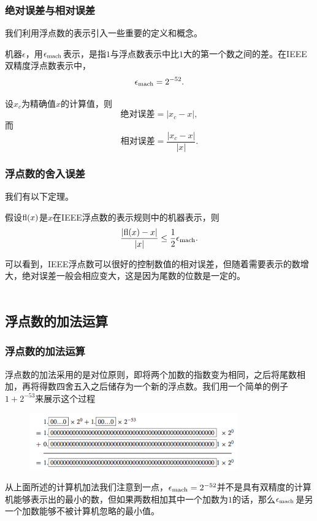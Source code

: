 \documentclass[10pt]{beamer}
\def\mach{\rm{mach}}
\begin{document}
\begin{frame}
\frametitle{绝对误差与相对误差}
我们利用浮点数的表示引入一些重要的定义和概念。
\begin{definition}[机器最小数]
机器$\epsilon$，用$\epsilon_{\mach}$表示，是指$1$与浮点数表示中比$1$大的第一个数之间的差。在IEEE双精度浮点数表示中，
\begin{equation}
\epsilon_{\mach} = 2^{-52}.
\end{equation}
\end{definition}

\begin{definition}[相对误差与绝对误差]
设$x_c$为精确值$x$的计算值，则
\begin{equation}
\text{绝对误差} = |x_c - x|,
\end{equation}
而
\begin{equation}
\text{相对误差} = \frac{|x_c - x|}{|x|}.
\end{equation}

\end{definition}

\end{frame}

\begin{frame}
\frametitle{浮点数的舍入误差}
我们有以下定理。
\begin{theorem}
假设${\rm{fl}}(x)$是$x$在{\rm{IEEE}}浮点数的表示规则中的机器表示，则
\begin{equation}
\frac{|{\rm{fl}}(x) - x|}{|x|} \le \frac{1}{2} \epsilon_{\mach}.
\end{equation}
\end{theorem}
可以看到，IEEE浮点数可以很好的控制数值的相对误差，但随着需要表示的数增大，绝对误差一般会相应变大，这是因为尾数的位数是一定的。\\
\ \\
\end{frame}

\subsection{浮点数的加法运算}

\begin{frame}
\frametitle{浮点数的加法运算}
浮点数的加法采用的是对位原则，即将两个加数的指数变为相同，之后将尾数相加，再将得数四舍五入之后储存为一个新的浮点数。我们用一个简单的例子$1+2^{-53}$来展示这个过程
\begin{figure}
\includegraphics[width=9cm]{figs/floating_number_addition.png} 
\end{figure}
从上面所述的计算机加法我们注意到一点，$\epsilon_{\mach} = 2^{-52}$并不是具有双精度的计算机能够表示出的最小的数，但如果两数相加其中一个加数为$1$的话，那么$\epsilon_{\mach}$是另一个加数能够不被计算机忽略的最小值。

\end{frame}
\end{document}
